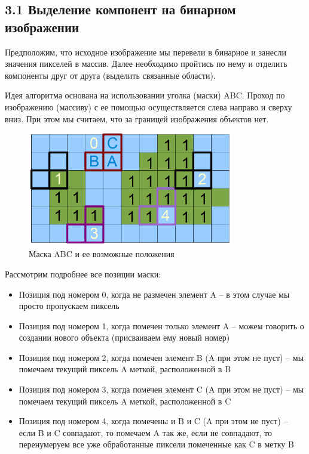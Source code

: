 \documentclass{report}
\begin{document}
\subsection*{3.1 Выделение компонент на бинарном изображении}
\par Предположим, что исходное изображение мы перевели в бинарное и занесли значения пикселей в массив. Далее необходимо пройтись по нему и отделить компоненты друг от друга (выделить связанные области). 
\par Идея алгоритма основана на использовании уголка (маски) ABC. Проход по изображению (массиву) с ее помощью осуществляется слева направо и сверху вниз. При этом мы считаем, что за границей изображения объектов нет.
\begin{figure}[htbp]
  \centering
  \includegraphics[width=0.8\textwidth]{3. ABC}
  \caption{Маска ABC и ее возможные положения}\label{fig:3. ABC}
\end{figure}
\par Рассмотрим подробнее все позиции маски:
\begin{itemize}
\item Позиция под номером 0, когда не размечен элемент A – в этом случае мы просто пропускаем пиксель
\item Позиция под номером 1, когда помечен только элемент A – можем говорить о создании нового объекта (присваиваем ему новый номер)
\item Позиция под номером 2, когда помечен элемент B (A при этом не пуст) – мы помечаем текущий пиксель A меткой, расположенной в B
\item Позиция под номером 3, когда помечен элемент C (A при этом не пуст) – мы помечаем текущий пиксель A меткой, расположенной в C
\item Позиция под номером 4, когда помечены и B и C (A при этом не пуст) – если B и C совпадают, то помечаем A так же, если не совпадают, то перенумеруем все уже обработанные пиксели помеченные как C в метку B
\end{itemize}
\end{document}
